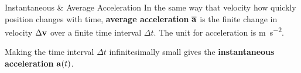 \documentclass[12pt,compress,aspectratio=169]{beamer}
\newcommand{\mb}[1]{\ensuremath\mathbf{#1}}
\newcommand{\eq}[2]{\vspace{#1}{\Large\begin{displaymath}#2\end{displaymath}}}
\begin{document}
\begin{frame}{Instantaneous \& Average Acceleration}
  In the same way that velocity how quickly position changes with time, 
  \textbf{average acceleration} $\overline{\mb{a}}$ is the finite change in
  velocity $\Delta\mb{v}$ over a finite time interval $\Delta t$.
  The unit for acceleration is \si{\metre\per\second^2}.

  \eq{-.2in}{
    \boxed{
      \overline{\mb{a}} = \frac{\Delta\mb{v}}{\Delta t}
      =\frac{\mb{v}-\mb{v}_0}{\Delta t}
    }
  }
  
  Making the time interval $\Delta t$ infinitesimally small gives the
  \textbf{instantaneous acceleration} $\mb{a}(t)$.
%
%
%
%
\end{frame}



%
%
%
%
%
%    
%
%
\end{document}
